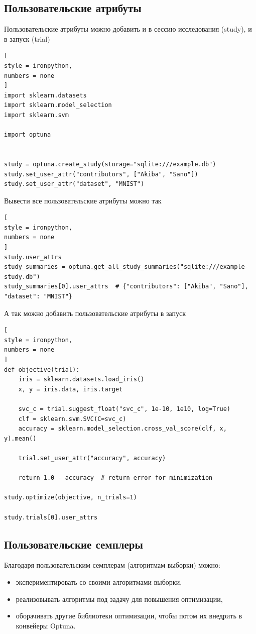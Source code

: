 \documentclass[%
	11pt,
	a4paper,
	utf8,
		]{article}
\begin{document}
\subsection{Пользовательские атрибуты}

Пользовательские атрибуты можно добавить и в сессию исследования (study), и в запуск (trial)
\begin{lstlisting}[
style = ironpython,
numbers = none
]
import sklearn.datasets
import sklearn.model_selection
import sklearn.svm

import optuna


study = optuna.create_study(storage="sqlite:///example.db")
study.set_user_attr("contributors", ["Akiba", "Sano"])
study.set_user_attr("dataset", "MNIST")
\end{lstlisting}

Вывести все пользовательские атрибуты можно так
\begin{lstlisting}[
style = ironpython,
numbers = none
]
study.user_attrs
study_summaries = optuna.get_all_study_summaries("sqlite:///example-study.db")
study_summaries[0].user_attrs  # {"contributors": ["Akiba", "Sano"], "dataset": "MNIST"}
\end{lstlisting}

А так можно добавить пользовательские атрибуты в запуск
\begin{lstlisting}[
style = ironpython,
numbers = none
]
def objective(trial):
	iris = sklearn.datasets.load_iris()
	x, y = iris.data, iris.target
	
	svc_c = trial.suggest_float("svc_c", 1e-10, 1e10, log=True)
	clf = sklearn.svm.SVC(C=svc_c)
	accuracy = sklearn.model_selection.cross_val_score(clf, x, y).mean()
	
	trial.set_user_attr("accuracy", accuracy)
	
	return 1.0 - accuracy  # return error for minimization

study.optimize(objective, n_trials=1)

study.trials[0].user_attrs
\end{lstlisting}

\subsection{Пользовательские семплеры}

Благодаря пользовательским семплерам (алгоритмам выборки) можно:
\begin{itemize}
	\item экспериментировать со своими алгоритмами выборки,
	
	\item реализовывать алгоритмы под задачу для повышения оптимизации,
	
	\item оборачивать другие библиотеки оптимизации, чтобы потом их внедрить в конвейеры Optuna.
\end{itemize}
\end{document}

